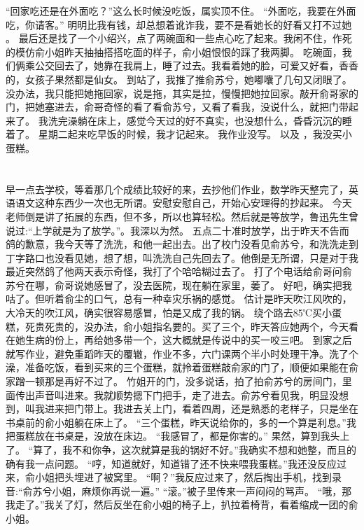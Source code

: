 “回家吃还是在外面吃？”这么长时候没吃饭，属实顶不住。
“外面吃，我要在外面吃，你请客。”
明明比我有钱，却总想着讹诈我，要不是看她长的好看又打不过她 。
最后还是找了一个小绍兴，点了两碗面和一些点心吃了起来。我闲不住，作死的模仿俞小姐昨天抽抽搭搭吃面的样子，俞小姐恨恨的踩了我两脚。
吃碗面，我们俩乘公交回去了，她靠在我肩上，睡了过去。我看着她的脸，可爱又好看，香香的，女孩子果然都是仙女。
到站了，我推了推俞苏兮，她嘟囔了几句又闭眼了。没办法，我只能把她拖回家，说是拖，其实是拉，慢慢把她拉回家。敲开俞哥家的门，把她塞进去，俞哥奇怪的看了看俞苏兮，又看了看我，没说什么，就把门带起来了。
我洗完澡躺在床上，感觉今天过的好不真实，也没想什么，昏昏沉沉的睡着了。
星期二起来吃早饭的时候，我才记起来。
我作业没写。
以及 ，我没买小蛋糕。

\chapter{}
早一点去学校，等着那几个成绩比较好的来，去抄他们作业，数学昨天整完了，英语语文这种东西少一次也无所谓。安慰安慰自己，开始心安理得的抄起来。
今天老师倒是讲了拓展的东西，但不多，所以也算轻松。然后就是等放学，鲁迅先生曾说过:“上学就是为了放学。”。我深以为然。
五点二十准时放学，出于昨天不告而鸽的歉意，我今天等了洗洗，和他一起出去。出了校门没看见俞苏兮，和洗洗走到丁字路口也没看见她，想了想，叫洗洗自己先回去了。他倒是无所谓，只是对于我最近突然鸽了他两天表示奇怪，我打了个哈哈糊过去了。
打了个电话给俞哥问俞苏兮在哪，俞哥说她感冒了，没去医院，现在躺在家里，萎了。 好吧，确实把我咕了。但听着俞尘的口气，总有一种幸灾乐祸的感觉。
估计是昨天吹江风吹的，大冷天的吹江风，确实很容易感冒，怕是又成了我的锅。
绕个路去85℃买小蛋糕，死贵死贵的，没办法，俞小姐指名要的。买了三个，昨天答应她两个，今天看在她生病的份上，再给她多带一个，这大概就是传说中的买一咬三吧。 到家之后就写作业，避免重蹈昨天的覆辙，作业不多，六门课两个半小时处理干净。洗了个澡，准备吃饭，看到买来的三个蛋糕，就拎着蛋糕敲俞家的门了，顺便如果能在俞家蹭一顿那是再好不过了。
竹姐开的门，没多说话，拍了拍俞苏兮的房间门，里面传出声音叫进来。我就顺势摁下门把手，走了进去。俞苏兮看见我，明显没想到，叫我进来把门带上。我进去关上门，看着四周，还是熟悉的老样子，只是坐在书桌前的俞小姐躺在床上了。
“三个蛋糕，昨天说给你的，多的一个算是利息。”我把蛋糕放在书桌是，没放在床边。
“我感冒了，都是你害的。”
果然，算到我头上了。
“算了，我不和你争，这次就算是我的锅好不好。”我确实不想和她整，而且的确有我一点问题。
“哼，知道就好，知道错了还不快来喂我蛋糕。”我还没反应过来，俞小姐把头埋进了被窝里。
“啊？”我反应过来了，然后掏出手机，找到录音:“俞苏兮小姐，麻烦你再说一遍。”
“滚。”被子里传来一声闷闷的骂声。 “哦，那我走了。”我关了灯，然后反坐在俞小姐的椅子上，扒拉着椅背，看着缩成一团的俞小姐。
